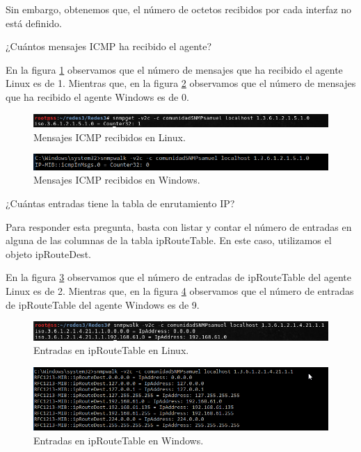 Sin embargo, obtenemos que, el número de octetos recibidos por cada interfaz no está definido.

\item ¿Cuántos mensajes ICMP ha recibido el agente?

En la figura \ref{image:icmp-linux} observamos que el número de mensajes que ha recibido el agente Linux es de 1. Mientras que, en la figura \ref{image:icmp-windows} observamos que el número de mensajes que ha recibido el agente Windows es de 0.

\FloatBarrier
\begin{figure}[htbp!]
		\centering
			\includegraphics[width=.9 \textwidth]{images/8-linux}
		\caption{Mensajes ICMP recibidos en Linux.}
		\label{image:icmp-linux}
\end{figure}
\FloatBarrier

\FloatBarrier
\begin{figure}[htbp!]
		\centering
			\includegraphics[width=.9 \textwidth]{images/8-windows}
		\caption{Mensajes ICMP recibidos en Windows.}
		\label{image:icmp-windows}
\end{figure}
\FloatBarrier

\item ¿Cuántas entradas tiene la tabla de enrutamiento IP?

Para responder esta pregunta, basta con listar y contar el número de entradas en alguna de las columnas de la tabla ipRouteTable. En este caso, utilizamos el objeto ipRouteDest.

En la figura \ref{image:route-linux} observamos que el número de entradas de ipRouteTable del agente Linux es de 2. Mientras que, en la figura \ref{image:route-windows} observamos que el número de entradas de ipRouteTable del agente Windows es de 9.

\FloatBarrier
\begin{figure}[htbp!]
		\centering
			\includegraphics[width=.9 \textwidth]{images/9-linux}
		\caption{Entradas en ipRouteTable en Linux.}
		\label{image:route-linux}
\end{figure}
\FloatBarrier

\FloatBarrier
\begin{figure}[htbp!]
		\centering
			\includegraphics[width=.9 \textwidth]{images/9-windows}
		\caption{Entradas en ipRouteTable en Windows.}
		\label{image:route-windows}
\end{figure}
\FloatBarrier